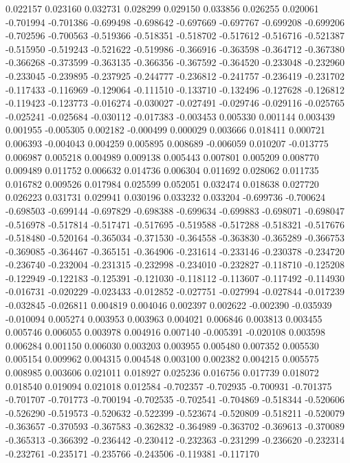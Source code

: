 0.022157
0.023160
0.032731
0.028299
0.029150
0.033856
0.026255
0.020061
-0.701994
-0.701386
-0.699498
-0.698642
-0.697669
-0.697767
-0.699208
-0.699206
-0.702596
-0.700563
-0.519366
-0.518351
-0.518702
-0.517612
-0.516716
-0.521387
-0.515950
-0.519243
-0.521622
-0.519986
-0.366916
-0.363598
-0.364712
-0.367380
-0.366268
-0.373599
-0.363135
-0.366356
-0.367592
-0.364520
-0.233048
-0.232960
-0.233045
-0.239895
-0.237925
-0.244777
-0.236812
-0.241757
-0.236419
-0.231702
-0.117433
-0.116969
-0.129064
-0.111510
-0.133710
-0.132496
-0.127628
-0.126812
-0.119423
-0.123773
-0.016274
-0.030027
-0.027491
-0.029746
-0.029116
-0.025765
-0.025241
-0.025684
-0.030112
-0.017383
-0.003453
0.005330
0.001144
0.003439
0.001955
-0.005305
0.002182
-0.000499
0.000029
0.003666
0.018411
0.000721
0.006393
-0.004043
0.004259
0.005895
0.008689
-0.006059
0.010207
-0.013775
0.006987
0.005218
0.004989
0.009138
0.005443
0.007801
0.005209
0.008770
0.009489
0.011752
0.006632
0.014736
0.006304
0.011692
0.028062
0.011735
0.016782
0.009526
0.017984
0.025599
0.052051
0.032474
0.018638
0.027720
0.026223
0.031731
0.029941
0.030196
0.033232
0.033204
-0.699736
-0.700624
-0.698503
-0.699144
-0.697829
-0.698388
-0.699634
-0.699883
-0.698071
-0.698047
-0.516978
-0.517814
-0.517471
-0.517695
-0.519588
-0.517288
-0.518321
-0.517676
-0.518480
-0.520164
-0.365034
-0.371530
-0.364558
-0.363830
-0.365289
-0.366753
-0.369085
-0.364467
-0.365151
-0.364906
-0.231614
-0.233146
-0.230378
-0.234720
-0.236740
-0.232004
-0.231315
-0.232998
-0.234010
-0.232827
-0.118710
-0.125208
-0.122949
-0.122183
-0.125391
-0.121030
-0.118112
-0.113607
-0.117492
-0.114930
-0.016731
-0.020229
-0.023433
-0.012852
-0.027751
-0.027994
-0.027844
-0.017239
-0.032845
-0.026811
0.004819
0.004046
0.002397
0.002622
-0.002390
-0.035939
-0.010094
0.005274
0.003953
0.003963
0.004021
0.006846
0.003813
0.003455
0.005746
0.006055
0.003978
0.004916
0.007140
-0.005391
-0.020108
0.003598
0.006284
0.001150
0.006030
0.003203
0.003955
0.005480
0.007352
0.005530
0.005154
0.009962
0.004315
0.004548
0.003100
0.002382
0.004215
0.005575
0.008985
0.003606
0.021011
0.018927
0.025236
0.016756
0.017739
0.018072
0.018540
0.019094
0.021018
0.012584
-0.702357
-0.702935
-0.700931
-0.701375
-0.701707
-0.701773
-0.700194
-0.702535
-0.702541
-0.704869
-0.518344
-0.520606
-0.526290
-0.519573
-0.520632
-0.522399
-0.523674
-0.520809
-0.518211
-0.520079
-0.363657
-0.370593
-0.367583
-0.362832
-0.364989
-0.363702
-0.369613
-0.370089
-0.365313
-0.366392
-0.236442
-0.230412
-0.232363
-0.231299
-0.236620
-0.232314
-0.232761
-0.235171
-0.235766
-0.243506
-0.119381
-0.117170
